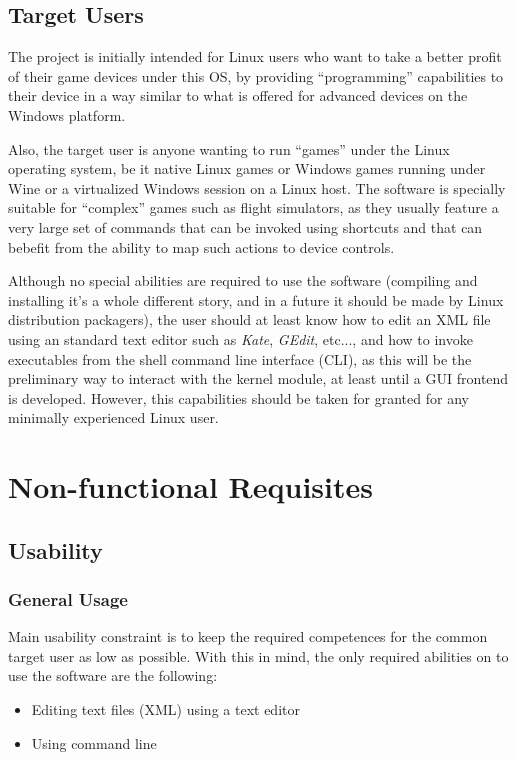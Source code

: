 \subsection{Target Users}
The project is initially intended for Linux users who want to take a better profit of their game devices under this OS, by providing ``programming'' capabilities to their device in a way similar to what is offered for advanced devices on the Windows platform. 

Also, the target user is anyone wanting to run ``games'' under the Linux operating system, be it native Linux games or Windows games running under Wine or a virtualized Windows session on a Linux host. The software is specially suitable for ``complex'' games such as flight simulators, as they usually feature a very large set of commands that can be invoked using shortcuts and that can bebefit from the ability to map such actions to device controls.

Although no special abilities are required to use the software (compiling and installing it's a whole different story, and in a future it should be made by Linux distribution packagers), the user should at least know how to edit an XML file using an standard text editor such as \emph{Kate}, \emph{GEdit}, etc..., and how to invoke executables from the shell command line interface (CLI), as this will be the preliminary way to interact with the kernel module, at least until a GUI frontend is developed. However, this capabilities should be taken for granted for any minimally experienced Linux user.


\section{Non-functional Requisites} 

\subsection{Usability}

\subsubsection{General Usage}
Main usability constraint is to keep the required competences for the common target user as low as possible. With this in mind, the only required abilities on to use the software are the following:
\begin{itemize}
 \item Editing text files (XML) using a text editor
 \item Using command line
\end{itemize}

